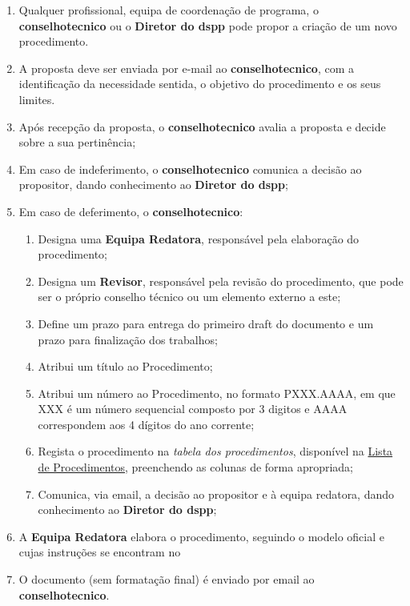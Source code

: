 \begin{enumerate}
  \item Qualquer profissional, equipa de coordenação de programa, o \textbf{\gls{conselhotecnico}} ou o \textbf{Diretor do \gls{dspp}} pode propor a criação de um novo procedimento.
  \item A proposta deve ser enviada por e-mail ao \textbf{\gls{conselhotecnico}}, com a identificação da necessidade sentida, o objetivo do procedimento e os seus limites.
  \item Após recepção da proposta, o \textbf{\gls{conselhotecnico}} avalia a proposta e decide sobre a sua pertinência;
  \item Em caso de indeferimento, o \textbf{\gls{conselhotecnico}} comunica a decisão ao propositor, dando conhecimento ao \textbf{Diretor do \gls{dspp}};
  \item Em caso de deferimento, o \textbf{\gls{conselhotecnico}}:
  \begin{enumerate}
    \item Designa uma \textbf{Equipa Redatora}, responsável pela elaboração do procedimento;
    \item Designa um \textbf{Revisor}, responsável pela revisão do procedimento, que pode ser o próprio conselho técnico ou um elemento externo a este;
    \item Define um prazo para entrega do primeiro draft do documento e um prazo para finalização dos trabalhos;
    \item Atribui um título ao Procedimento;
    \item Atribui um número ao Procedimento, no formato PXXX.AAAA, em que XXX é um número sequencial composto por 3 digitos e AAAA correspondem aos 4 dígitos do ano corrente;
    \item Regista o procedimento na \textit{tabela dos procedimentos}, disponível na \href{https://snspt-my.sharepoint.com/:l:/r/personal/93839_ulso_min-saude_pt/Lists/Lista%20de%20Procedimentos?e=zkbTNC}{Lista de Procedimentos}, preenchendo as colunas de forma apropriada;
    \item Comunica, via email, a decisão ao propositor e à equipa redatora, dando conhecimento ao \textbf{Diretor do \gls{dspp}};
  \end{enumerate}
  \item A \textbf{Equipa Redatora} elabora o procedimento, seguindo o modelo oficial e cujas instruções se encontram no 
  \item O documento (sem formatação final) é enviado por email ao \textbf{\gls{conselhotecnico}}.

\end{enumerate}
